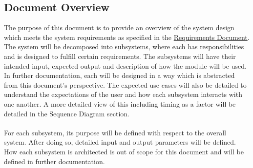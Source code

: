 \documentclass[11pt]{article}
\begin{document}
\subsection{Document Overview}
The purpose of this document is to provide an overview of the system design which meets the system requirements as specified in the \href{run:../Requirements/Requirements.pdf}{Requirements Document}. The system will be decomposed into subsystems, where each has responsibilities and is designed to fulfill certain requirements. The subsystems will have their intended input, expected output and description of how the module will be used. In further documentation, each will be designed in a way which is abstracted from this document's perspective. The expected use cases will also be detailed to understand the expectations of the user and how each subsystem interacts with one another. A more detailed view of this including timing as a factor will be detailed in the Sequence Diagram section. \\ \\ %
For each subsystem, its purpose will be defined with respect to the overall system. After doing so, detailed input and output parameters will be defined. How each subsystem is architected is out of scope for this document and will be defined in further documentation. \\ \\
\end{document}

